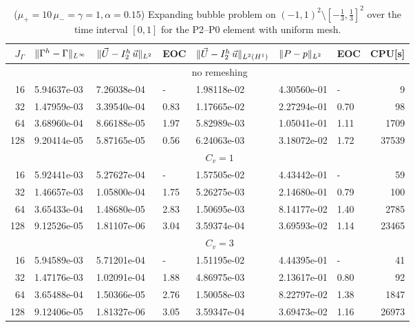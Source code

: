 \begin{table}
\center
\hspace*{-3.25cm}
\begin{tabular}{rllllllr}
\hline
$J_\Gamma$ & $\|\Gamma^h - \Gamma\|_{L^\infty}$ & $\|\vec U - I^h_{2}\,\vec u\|_{L^2}$ & EOC & $\|\vec U - I^h_{2}\,\vec u\|_{L^2(H^1)}$ & $\|P - p\|_{L^2}$ & EOC
& CPU[s] \\
\hline
& \multicolumn{7}{c}{no remeshing} \\
\hline
 16 & 5.94637e-03 & 7.26038e-04 &    - & 1.98118e-02 & 4.30560e-01 &    - &
9 \\
 32 & 1.47959e-03 & 3.39540e-04 & 0.83 & 1.17665e-02 & 2.27294e-01 & 0.70 &
98 \\
 64 & 3.68960e-04 & 8.66188e-05 & 1.97 & 5.82989e-03 & 1.05041e-01 & 1.11 &
1709 \\
128 & 9.20414e-05 & 5.87165e-05 & 0.56 & 6.24063e-03 & 3.18072e-02 & 1.72 &
37539 \\
\hline
& \multicolumn{7}{c}{$C_v=1$} \\
\hline
 16 & 5.92441e-03 & 5.27627e-04 &    - & 1.57505e-02 & 4.43442e-01 &    - &
59 \\
 32 & 1.46657e-03 & 1.05800e-04 & 1.75 & 5.26275e-03 & 2.14680e-01 & 0.79 &
100 \\
 64 & 3.65433e-04 & 1.48680e-05 & 2.83 & 1.50695e-03 & 8.14177e-02 & 1.40 &
2785 \\
128 & 9.12526e-05 & 1.81107e-06 & 3.04 & 3.59374e-04 & 3.69593e-02 & 1.14 &
23465 \\
\hline
& \multicolumn{7}{c}{$C_v=3$} \\
\hline
 16 & 5.94589e-03 & 5.71201e-04 &    - & 1.51195e-02 & 4.44395e-01 &    - &
41 \\
 32 & 1.47176e-03 & 1.02091e-04 & 1.88 & 4.86975e-03 & 2.13617e-01 & 0.80 &
92 \\
 64 & 3.65488e-04 & 1.50366e-05 & 2.76 & 1.50058e-03 & 8.22797e-02 & 1.38 &
1847 \\
128 & 9.12406e-05 & 1.81327e-06 & 3.05 & 3.59347e-04 & 3.69473e-02 & 1.16 &
26973 \\
\hline
\end{tabular}
\hspace*{-3.25cm}
\caption[Stokes expanding bubble uniform mesh errors P2--P0]
{($\mu_+ = 10\,\mu_- = \gamma = 1,\alpha = 0.15$) Expanding bubble
problem on $(-1,1)^2\setminus[-\frac{1}{3},\frac{1}{3}]^2$ over the time
interval $[0,1]$ for the P2--P0 element with uniform mesh.}
\label{tab:expandingbubble2Dp2p0}
\end{table}
